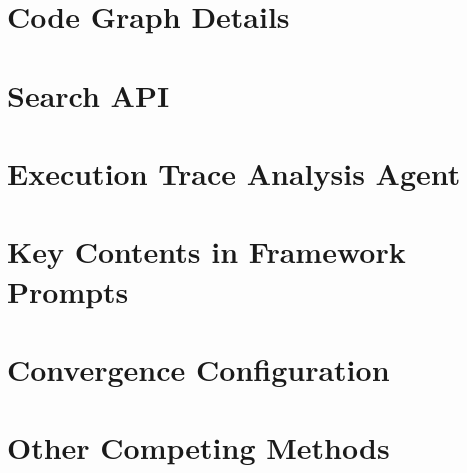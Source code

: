 \section{Code Graph Details} \label{appendix:codegraph}

\section{Search API} \label{appendix:api}

\section{Execution Trace Analysis Agent} \label{appendix:tracer}

\section{Key Contents in Framework Prompts} \label{appendix:prompt}

\section{Convergence Configuration}\label{appendix:convergence}

\section{Other Competing Methods}\label{appendix:competitor}
